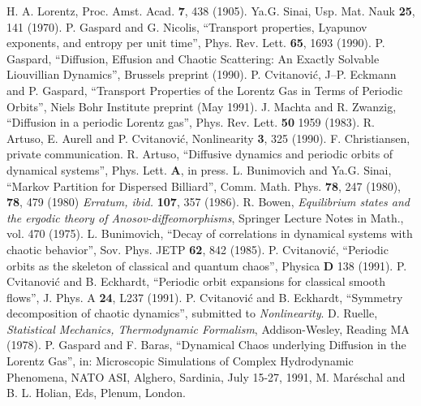 \documentclass[pre,twocolumn,groupedaddress,showpacs,showkeys]{revtex4}
\begin{document}
\begin{thebibliography}{10}

 H. A. Lorentz, Proc. Amst. Acad. {\bf 7}, 438 (1905).
 Ya.G. Sinai, Usp. Mat.  Nauk {\bf 25}, 141 (1970).
 P. Gaspard and G. Nicolis, ``Transport properties, Lyapunov
   exponents, and entropy per unit time'', Phys. Rev. Lett. {\bf 65}, 1693
   (1990).
 P. Gaspard, ``Diffusion, Effusion and Chaotic Scattering:
  An Exactly Solvable Liouvillian Dynamics'', Brussels preprint (1990).
 P. Cvitanovi\'c, J--P. Eckmann and P. Gaspard, ``Transport
  Properties of the Lorentz Gas in Terms of Periodic Orbits'', Niels
  Bohr Institute preprint (May 1991).
 J. Machta and R. Zwanzig, ``Diffusion in a periodic Lorentz gas'',
   Phys. Rev. Lett. {\bf 50} 1959 (1983).
 R. Artuso, E. Aurell and P. Cvitanovi\'c, Nonlinearity {\bf 3},
  325 (1990).
 F. Christiansen, private communication.
 R. Artuso, ``Diffusive dynamics and periodic orbits of dynamical
  systems'', Phys.  Lett. {\bf A}, in press.
 L. Bunimovich and Ya.G. Sinai, ``Markov Partition for Dispersed
  Billiard'', Comm. Math. Phys. {\bf 78}, 247 (1980), {\bf 78}, 479 (1980)
  {\sl Erratum,  ibid.} {\bf 107}, 357 (1986).
 R. Bowen, {\em Equilibrium states and the ergodic theory of
  Anosov-diffeomorphisms}, Springer Lecture Notes in Math., vol. 470 (1975).
 L. Bunimovich, ``Decay of correlations in dynamical systems with
  chaotic behavior'', Sov. Phys. JETP {\bf 62}, 842 (1985).
 P. Cvitanovi\'c, ``Periodic orbits as the skeleton of classical and
  quantum chaos'', Physica {\bf D} 138 (1991).
 P. Cvitanovi\'c and  B. Eckhardt, ``Periodic orbit expansions for
  classical smooth flows'', J. Phys. A {\bf 24}, L237 (1991).
 P. Cvitanovi\'c and  B. Eckhardt, ``Symmetry decomposition of
  chaotic dynamics'', submitted to {\em Nonlinearity}.
 D. Ruelle, {\em Statistical Mechanics, Thermodynamic Formalism},
Addison-Wesley, Reading MA (1978).
 P. Gaspard and  F. Baras, ``Dynamical Chaos underlying
Diffusion in the Lorentz Gas'', in: Microscopic Simulations of Complex
Hydrodynamic Phenomena, NATO ASI, Alghero, Sardinia, July 15-27, 1991,
M. Mar\'eschal and B. L. Holian, Eds, Plenum, London.
\end{thebibliography}
\end{document}
